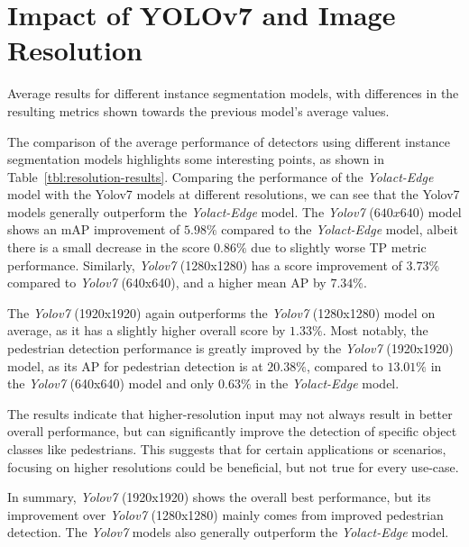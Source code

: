 
\section{Impact of YOLOv7 and Image Resolution}
\label{sec:impactyolov7}

\begin{table}[htbp]
    
    \caption{Average results for different instance segmentation models, with differences in the resulting metrics shown towards the previous model's average values.}
    \label{tbl:resolution-results}
\end{table}

The comparison of the average performance of detectors using different instance segmentation models highlights some interesting points, as shown in Table~\ref{tbl:resolution-results}.
Comparing the performance of the \textit{Yolact-Edge} model with the Yolov7 models at different resolutions, we can see that the Yolov7 models generally outperform the \textit{Yolact-Edge} model.
The \textit{Yolov7} ($640x640$) model shows an mAP improvement of $5.98\%$ compared to the \textit{Yolact-Edge} model, albeit there is a small decrease in the score $0.86\%$ due to slightly worse TP metric performance.
Similarly, \textit{Yolov7} (1280x1280) has a score improvement of $3.73\%$ compared to \textit{Yolov7} (640x640), and a higher mean AP by $7.34\%$.

The \textit{Yolov7} (1920x1920) again outperforms the \textit{Yolov7} (1280x1280) model on average, as it has a slightly higher overall score by $1.33\%$.
Most notably, the pedestrian detection performance is greatly improved by the \textit{Yolov7} (1920x1920) model, as its AP for pedestrian detection is at $20.38\%$, compared to $13.01\%$ in the \textit{Yolov7} (640x640) model and only $0.63\%$ in the \textit{Yolact-Edge} model.

The results indicate that higher-resolution input may not always result in better overall performance, but can significantly improve the detection of specific object classes like pedestrians.
This suggests that for certain applications or scenarios, focusing on higher resolutions could be beneficial, but not true for every use-case.

In summary, \textit{Yolov7} (1920x1920) shows the overall best performance, but its improvement over \textit{Yolov7} (1280x1280) mainly comes from improved pedestrian detection.
The \textit{Yolov7} models also generally outperform the \textit{Yolact-Edge} model.

